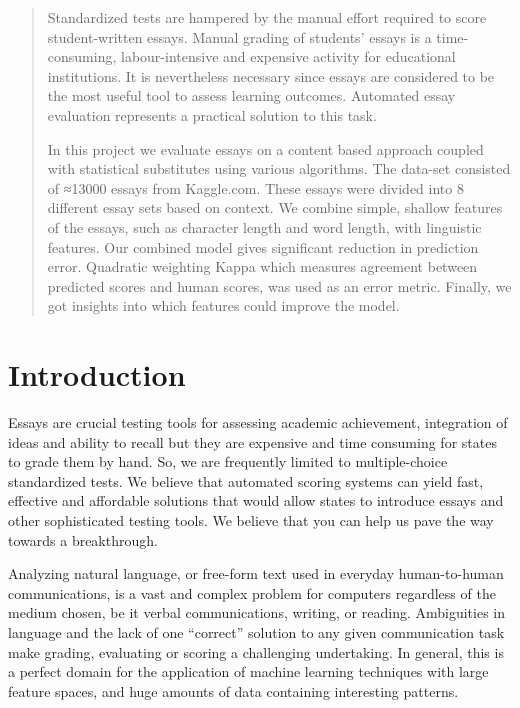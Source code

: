 \documentclass[BTech]{nitkdiss}
\begin{document}
\singlespacing
\def\code#1{\texttt{#1}}
\newpage
\begin{abstract}
Standardized tests are hampered by the manual effort required to score student-written essays. Manual grading of students' essays is a time-consuming, labour-intensive and expensive activity for educational institutions. It is nevertheless necessary since essays are considered to be the most useful tool to assess learning outcomes. Automated essay evaluation represents a practical solution to this task. 

In this project we evaluate essays on a content based approach coupled with statistical substitutes using various algorithms. The data-set consisted of ≈13000 essays from Kaggle.com. These essays were divided into 8 different essay sets based on context. We combine simple, shallow features of the essays, such as character length and word length, with linguistic features. Our combined model gives significant reduction in prediction error. Quadratic weighting Kappa which measures agreement between predicted scores and human scores, was used as an error metric. Finally, we got insights into which features could improve the model. 

\end{abstract}

\newpage
\tableofcontents
\listoffigures
\newpage
\pagestyle{plain}

\chapter{Introduction}           
Essays are crucial testing tools for assessing academic achievement, integration of ideas and ability to recall but they are expensive and time consuming for states to grade them by hand.  So, we are frequently limited to multiple-choice standardized tests. We believe that automated scoring systems can yield fast, effective and affordable solutions that would allow states to introduce essays and other sophisticated testing tools.  We believe that you can help us pave the way towards a breakthrough.  

Analyzing natural language, or free-form text used in everyday human-to-human communications, is a vast and complex problem for computers regardless of the medium chosen, be it verbal communications,
writing, or reading. Ambiguities in language and the lack of one “correct” solution to any given communication task make grading, evaluating or scoring a challenging undertaking. In general, this is a perfect domain for the application of machine learning techniques with large feature spaces, and huge amounts of data containing interesting patterns.
\end{document}
